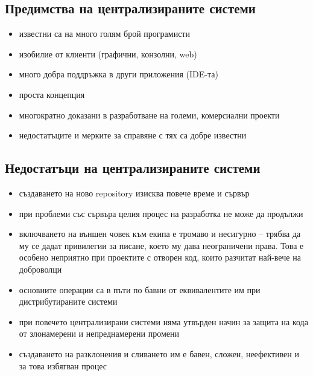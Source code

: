 \documentclass[a4paper]{article}
\begin{document}
  \subsection{Предимства на централизираните системи}
    \begin{itemize}
      \item известни са на много голям брой програмисти
      \item изобилие от клиенти (графични, конзолни, web)
      \item много добра поддръжка в други приложения (IDE-та)
      \item проста концепция
      \item многократно доказани в разработване на големи, комерсиални проекти
      \item недостатъците и мерките за справяне с тях са добре известни
    \end{itemize}

  \subsection{Недостатъци на централизираните системи}
    \begin{itemize}
      \item създаването на ново repository изисква повече време и сървър
      \item при проблеми със сървъра целия процес на разработка не може да продължи
      \item включването на външен човек към екипа е тромаво и несигурно -- трябва да му се дадат привилегии за писане, което му дава неограничени права. Това е особено неприятно при проектите с отворен код, които разчитат най-вече на доброволци
      \item основните операции са в пъти по бавни от еквивалентите им при дистрибутираните системи
      \item при повечето централизирани системи няма утвърден начин за защита на кода от злонамерени и непреднамерени промени
      \item създаването на разклонения и сливането им е бавен, сложен, неефективен и за това избягван процес
    \end{itemize}
\end{document}
